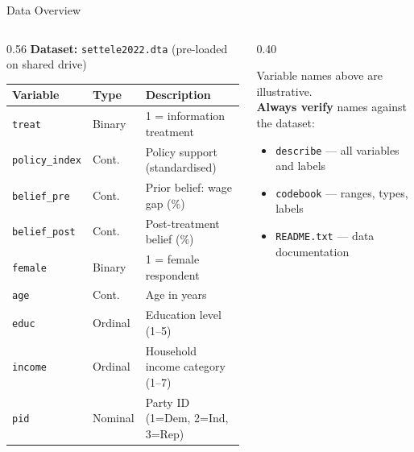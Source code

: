 \documentclass[aspectratio=169, 11pt]{beamer}
\begin{document}
\begin{frame}[t]{Data Overview}
\begin{columns}[T]
\begin{column}{0.56\textwidth}
\textbf{Dataset:} \texttt{settele2022.dta} (pre-loaded on shared drive)
\vspace{0.5em}

\begin{footnotesize}
\begin{tabular}{lll}
\toprule
\textbf{Variable} & \textbf{Type} & \textbf{Description} \\
\midrule
\texttt{treat}         & Binary  & 1 = information treatment \\
\texttt{policy\_index} & Cont.   & Policy support (standardised) \\
\texttt{belief\_pre}   & Cont.   & Prior belief: wage gap (\%) \\
\texttt{belief\_post}  & Cont.   & Post-treatment belief (\%) \\
\texttt{female}        & Binary  & 1 = female respondent \\
\texttt{age}           & Cont.   & Age in years \\
\texttt{educ}          & Ordinal & Education level (1--5) \\
\texttt{income}        & Ordinal & Household income category (1--7) \\
\texttt{pid}           & Nominal & Party ID (1=Dem, 2=Ind, 3=Rep) \\
\bottomrule
\end{tabular}
\end{footnotesize}
\end{column}
\begin{column}{0.40\textwidth}
\begin{keybox}
\small
Variable names above are illustrative.\\[0.3em]
\textbf{Always verify} names against the dataset:
\vspace{0.3em}
\begin{itemize}
  \setlength\itemsep{0.25em}
  \item \texttt{describe} — all variables and labels
  \item \texttt{codebook} — ranges, types, labels
  \item \texttt{README.txt} — data documentation
\end{itemize}
\vspace{0.3em}
\end{keybox}
\end{column}
\end{columns}
\end{frame}
\end{document}
